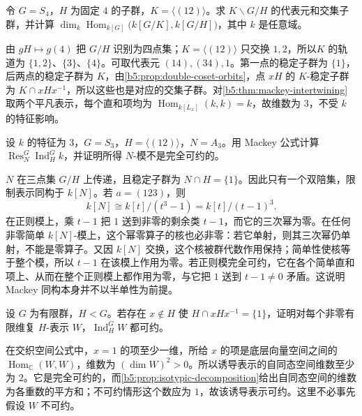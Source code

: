 \begin{exercise}\label{b5:ex:04-unequal-subgroups}
	令 \(G=S_4\)，\(H\) 为固定 \(4\) 的子群，\(K=\bigl\langle(12)\bigr\rangle\)。求 \(K\backslash G/H\) 的代表元和交集子群，并计算 \(\dim_k\operatorname{Hom}_{k[G]}\bigl(k[G/K],k[G/H]\bigr)\)，其中 \(k\) 是任意域。
\end{exercise}
\begin{solution}
	由 \(gH\mapsto g(4)\) 把 \(G/H\) 识别为四点集；\(K=\langle(12)\rangle\) 只交换 \(1,2\)，所以\(K\) 的轨道为 \(\{1,2\}\)、\(\{3\}\)、\(\{4\}\)。可取代表元 \((14),(34),1\)。第一点的稳定子群为 \(\{1\}\)，后两点的稳定子群为 \(K\)，由\cref{b5:prop:double-coset-orbits}，点 \(xH\) 的 \(K\)-稳定子群为 \(K\cap xHx^{-1}\)，所以这些也是对应的交集子群。对\cref{b5:thm:mackey-intertwining}取两个平凡表示，每个直和项均为 \(\operatorname{Hom}_{k[L_x]}(k,k)=k\)，故维数为 \(3\)，不受 \(k\) 的特征影响。
\end{solution}

\begin{exercise}\label{b5:ex:04-modular-mackey}
	设 \(k\) 的特征为 \(3\)，\(G=S_3\)，\(H=\bigl\langle(12)\bigr\rangle\)，\(N=A_3\)。用 Mackey 公式计算 \(\operatorname{Res}_N^G\operatorname{Ind}_H^G k\)，并证明所得 \(N\)-模不是完全可约的。
\end{exercise}
\begin{solution}
	\(N\) 在三点集 \(G/H\) 上传递，且稳定子群为 \(N\cap H=\{1\}\)。因此只有一个双陪集，限制表示同构于 \(k[N]\)。若 \(a=(123)\)，则
	\[
		k[N]\cong k[t]/(t^3-1)=k[t]/(t-1)^3.
	\]
	在正则模上，乘 \(t-1\) 把 \(1\) 送到非零的剩余类 \(t-1\)，而它的三次幂为零。在任何非零简单 \(k[N]\)-模上，这个幂零算子的核也必非零：若它单射，则其三次幂仍单射，不能是零算子。又因 \(k[N]\) 交换，这个核被群代数作用保持；简单性使核等于整个模，所以 \(t-1\) 在该模上作用为零。若正则模完全可约，它在各个简单直和项上、从而在整个正则模上都作用为零，与它把 \(1\) 送到 \(t-1\ne0\) 矛盾。这说明 Mackey 同构本身并不以半单性为前提。
\end{solution}

\begin{exercise}\label{b5:ex:04-trivial-intersection-obstruction}
	设 \(G\) 为有限群，\(H<G\)。若存在 \(x\notin H\) 使 \(H\cap xHx^{-1}=\{1\}\)，证明对每个非零有限维复 \(H\)-表示 \(W\)，\(\operatorname{Ind}_H^G W\) 都可约。
\end{exercise}
\begin{solution}
	在交织空间公式中，\(x=1\) 的项至少一维，所给 \(x\) 的项是底层向量空间之间的 \(\operatorname{Hom}_{\mathbb C}(W,W)\)，维数为 \((\dim W)^2>0\)。所以诱导表示的自同态空间维数至少为 \(2\)。它是完全可约的，而\cref{b5:prop:isotypic-decomposition}给出自同态空间的维数为各重数的平方和；不可约情形这个数应为 \(1\)，故该诱导表示可约。这里不必事先假设 \(W\) 不可约。
\end{solution}

